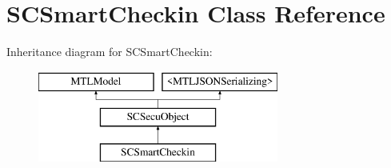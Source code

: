 \hypertarget{interface_s_c_smart_checkin}{}\section{S\+C\+Smart\+Checkin Class Reference}
\label{interface_s_c_smart_checkin}
Inheritance diagram for S\+C\+Smart\+Checkin\+:\begin{figure}[H]
\begin{center}
\leavevmode
\includegraphics[height=3.000000cm]{interface_s_c_smart_checkin}
\end{center}
\end{figure}
